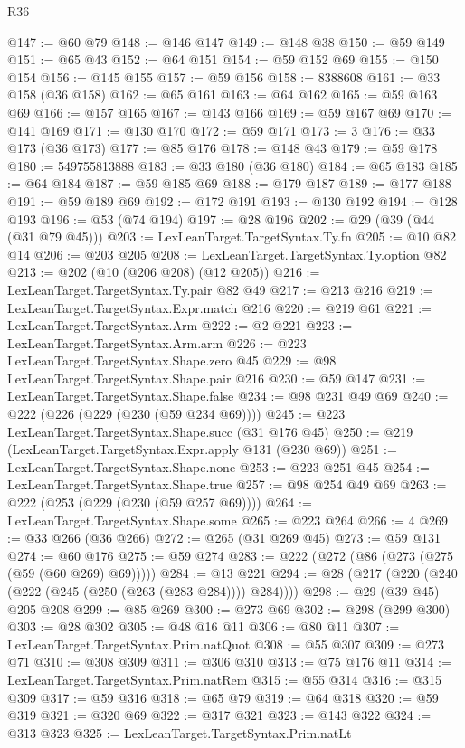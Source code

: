 \begin{lexlean}{R36}
\begin{coremodule}
@147 := @60 @79
@148 := @146 @147
@149 := @148 @38
@150 := @59 @149
@151 := @65 @43
@152 := @64 @151
@154 := @59 @152 @69
@155 := @150 @154
@156 := @145 @155
@157 := @59 @156
@158 := 8388608
@161 := @33 @158 (@36 @158)
@162 := @65 @161
@163 := @64 @162
@165 := @59 @163 @69
@166 := @157 @165
@167 := @143 @166
@169 := @59 @167 @69
@170 := @141 @169
@171 := @130 @170
@172 := @59 @171
@173 := 3
@176 := @33 @173 (@36 @173)
@177 := @85 @176
@178 := @148 @43
@179 := @59 @178
@180 := 549755813888
@183 := @33 @180 (@36 @180)
@184 := @65 @183
@185 := @64 @184
@187 := @59 @185 @69
@188 := @179 @187
@189 := @177 @188
@191 := @59 @189 @69
@192 := @172 @191
@193 := @130 @192
@194 := @128 @193
@196 := @53 (@74 @194)
@197 := @28 @196
@202 := @29 (@39 (@44 (@31 @79 @45)))
@203 := LexLeanTarget.TargetSyntax.Ty.fn
@205 := @10 @82 @14
@206 := @203 @205
@208 := LexLeanTarget.TargetSyntax.Ty.option @82
@213 := @202 (@10 (@206 @208) (@12 @205))
@216 := LexLeanTarget.TargetSyntax.Ty.pair @82 @49
@217 := @213 @216
@219 := LexLeanTarget.TargetSyntax.Expr.match @216
@220 := @219 @61
@221 := LexLeanTarget.TargetSyntax.Arm
@222 := @2 @221
@223 := LexLeanTarget.TargetSyntax.Arm.arm
@226 := @223 LexLeanTarget.TargetSyntax.Shape.zero @45
@229 := @98 LexLeanTarget.TargetSyntax.Shape.pair @216
@230 := @59 @147
@231 := LexLeanTarget.TargetSyntax.Shape.false
@234 := @98 @231 @49 @69
@240 := @222 (@226 (@229 (@230 (@59 @234 @69))))
@245 := @223 LexLeanTarget.TargetSyntax.Shape.succ (@31 @176 @45)
@250 := @219 (LexLeanTarget.TargetSyntax.Expr.apply @131 (@230 @69))
@251 := LexLeanTarget.TargetSyntax.Shape.none
@253 := @223 @251 @45
@254 := LexLeanTarget.TargetSyntax.Shape.true
@257 := @98 @254 @49 @69
@263 := @222 (@253 (@229 (@230 (@59 @257 @69))))
@264 := LexLeanTarget.TargetSyntax.Shape.some
@265 := @223 @264
@266 := 4
@269 := @33 @266 (@36 @266)
@272 := @265 (@31 @269 @45)
@273 := @59 @131
@274 := @60 @176
@275 := @59 @274
@283 := @222 (@272 (@86 (@273 (@275 (@59 (@60 @269) @69)))))
@284 := @13 @221
@294 := @28 (@217 (@220 (@240 (@222 (@245 (@250 (@263 (@283 @284)))) @284))))
@298 := @29 (@39 @45) @205 @208
@299 := @85 @269
@300 := @273 @69
@302 := @298 (@299 @300)
@303 := @28 @302
@305 := @48 @16 @11
@306 := @80 @11
@307 := LexLeanTarget.TargetSyntax.Prim.natQuot
@308 := @55 @307
@309 := @273 @71
@310 := @308 @309
@311 := @306 @310
@313 := @75 @176 @11
@314 := LexLeanTarget.TargetSyntax.Prim.natRem
@315 := @55 @314
@316 := @315 @309
@317 := @59 @316
@318 := @65 @79
@319 := @64 @318
@320 := @59 @319
@321 := @320 @69
@322 := @317 @321
@323 := @143 @322
@324 := @313 @323
@325 := LexLeanTarget.TargetSyntax.Prim.natLt

\end{coremodule}
\end{lexlean}

